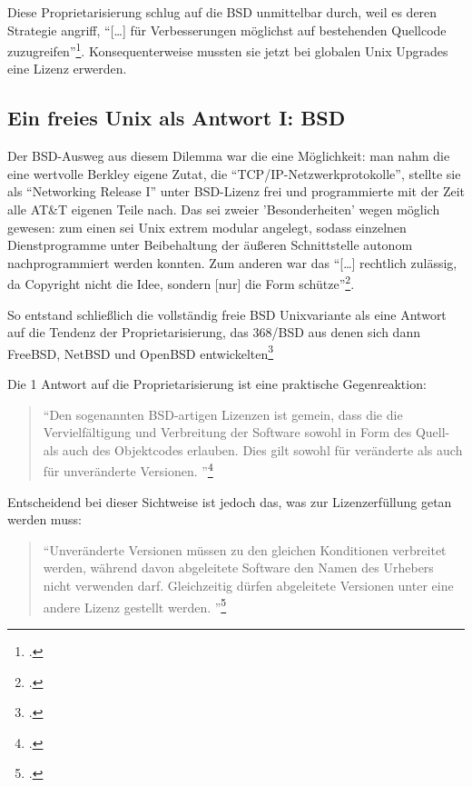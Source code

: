 \documentclass[DIV=calc,BCOR=5mm,11pt,headings=small,oneside,abstract=true, toc=bib]{scrartcl}
\begin{document}
Diese Proprietarisierung schlug auf die BSD unmittelbar durch, weil es deren
Strategie angriff, \enquote{[\ldots] für Verbesserungen möglichst auf
bestehenden Quellcode zuzugreifen}\footcite[vgl.][106]{Eckl2004a}.
Konsequenterweise mussten sie jetzt bei globalen Unix Upgrades eine Lizenz
erwerden.

\subsection{Ein freies Unix als Antwort I: BSD}

Der BSD-Ausweg aus diesem Dilemma war die eine Möglichkeit: man nahm die eine
wertvolle Berkley eigene Zutat, die \enquote{TCP/IP-Netzwerkprotokolle},
stellte sie als \enquote{Networking Release I} unter BSD-Lizenz frei und
programmierte mit der Zeit alle AT\&T eigenen Teile nach. Das sei zweier
'Besonderheiten' wegen möglich gewesen: zum einen sei Unix extrem modular
angelegt, sodass einzelnen Dienstprogramme unter Beibehaltung der äußeren
Schnittstelle autonom nachprogrammiert werden konnten. Zum anderen war das
\enquote{[\ldots] rechtlich zulässig, da Copyright nicht die Idee, sondern
[nur] die Form schütze}\footcite[vgl.][107]{Eckl2004a}.

So entstand schließlich die vollständig freie BSD Unixvariante als eine Antwort
auf die Tendenz der Proprietarisierung, das 368/BSD aus denen sich dann FreeBSD,
NetBSD und OpenBSD entwickelten\footcite[vgl.][107]{Eckl2004a}

Die 1 Antwort auf die Proprietarisierung ist eine praktische Gegenreaktion: 

\begin{quote}
\enquote{Den sogenannten BSD-artigen Lizenzen ist gemein, dass die die
Vervielfältigung und Verbreitung der Software sowohl in Form des Quell- als auch
des Objektcodes erlauben. Dies gilt sowohl für veränderte als auch für
unveränderte Versionen.
}\footcite[][108]{Eckl2004a}
\end{quote}

Entscheidend bei dieser Sichtweise ist jedoch das, was zur Lizenzerfüllung getan
werden muss:

\begin{quote}
\enquote{Unveränderte Versionen müssen zu den gleichen Konditionen verbreitet
werden, während davon abgeleitete Software den Namen des Urhebers nicht
verwenden darf. Gleichzeitig dürfen abgeleitete Versionen unter eine andere
Lizenz gestellt werden.
}\footcite[][108]{Eckl2004a}
\end{quote}
\end{document}
